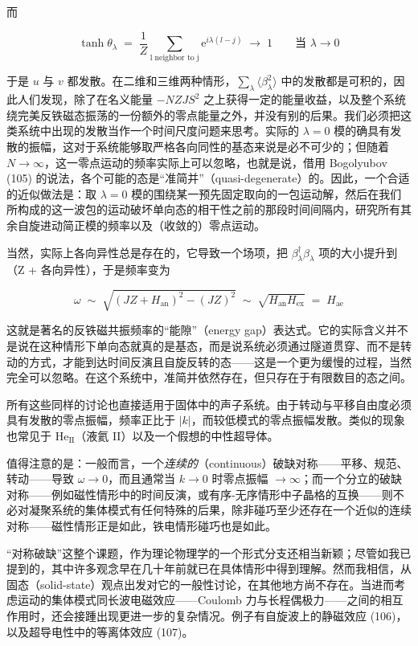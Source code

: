 而

\begin{equation*}
\tanh\theta_\lambda \;=\; \frac{1}{Z}\sum_{\text{l neighbor to j}} \mathrm{e}^{i\lambda(l-j)} \;\to\; 1 \qquad\text{当 } \lambda\to 0
\end{equation*}

于是 $u$ 与 $v$ 都发散。在二维和三维两种情形，$\sum_\lambda\langle\beta_\lambda^2\rangle$ 中的发散都是可积的，因此人们发现，除了在名义能量 $-NZJS^2$ 之上获得一定的能量收益，以及整个系统绕完美反铁磁态振荡的一份额外的零点能量之外，并没有别的后果。我们必须把这类系统中出现的发散当作一个时间尺度问题来思考。实际的 $\lambda = 0$ 模的确具有发散的振幅，这对于系统能够取严格各向同性的基态来说是必不可少的；但随着 $N\to\infty$，这一零点运动的频率实际上可以忽略，也就是说，借用 Bogolyubov (105) 的说法，各个可能的态是“准简并”（quasi-degenerate）的。因此，一个合适的近似做法是：取 $\lambda = 0$ 模的围绕某一预先固定取向的一包运动解，然后在我们所构成的这一波包的运动破坏单向态的相干性之前的那段时间间隔内，研究所有其余自旋进动简正模的频率以及（收敛的）零点运动。

当然，实际上各向异性总是存在的，它导致一个场项，把 $\beta_\lambda^\dagger\beta_\lambda$ 项的大小提升到（Z + 各向异性），于是频率变为

\begin{equation*}
\omega \;\sim\; \sqrt{\left(JZ + H_{\text{an}}\right)^2 - \left(JZ\right)^2} \;\sim\; \sqrt{H_{\text{an}}H_{\text{ex}}} \;=\; H_{\text{ae}}
\end{equation*}

这就是著名的反铁磁共振频率的“能隙”（energy gap）表达式。它的实际含义并不是说在这种情形下单向态就真的是基态，而是说系统必须通过隧道贯穿、而不是转动的方式，才能到达时间反演且自旋反转的态——这是一个更为缓慢的过程，当然完全可以忽略。在这个系统中，准简并依然存在，但只存在于有限数目的态之间。

所有这些同样的讨论也直接适用于固体中的声子系统。由于转动与平移自由度必须具有发散的零点振幅，频率正比于 $|k|$，而较低模式的零点振幅发散。类似的现象也常见于 $\mathrm{He}_{\mathrm{II}}$（液氦 II）以及一个假想的中性超导体。

值得注意的是：一般而言，一个\emph{连续的}（continuous）破缺对称——平移、规范、转动——导致 $\omega\to 0$，而且通常当 $k\to 0$ 时零点振幅 $\to\infty$；而一个分立的破缺对称——例如磁性情形中的时间反演，或有序-无序情形中子晶格的互换——则不必对凝聚系统的集体模式有任何特殊的后果，除非碰巧至少还存在一个近似的连续对称——磁性情形正是如此，铁电情形碰巧也是如此。

“对称破缺”这整个课题，作为理论物理学的一个形式分支还相当新颖；尽管如我已提到的，其中许多观念早在几十年前就已在具体情形中得到理解。然而我相信，从固态（solid-state）观点出发对它的一般性讨论，在其他地方尚不存在。当进而考虑运动的集体模式同长波电磁效应——Coulomb 力与长程偶极力——之间的相互作用时，还会接踵出现更进一步的复杂情况。例子有自旋波上的静磁效应 (106)，以及超导电性中的等离体效应 (107)。
